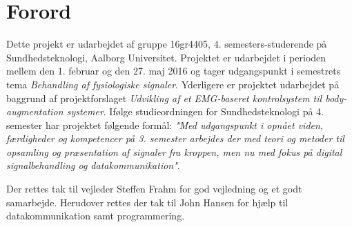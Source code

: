 \chapter*{Forord}
Dette projekt er udarbejdet af gruppe 16gr4405, 4. semesters-studerende på Sundhedsteknologi, Aalborg Universitet. Projektet er udarbejdet i perioden mellem den 1. februar og den 27. maj 2016 og tager udgangspunkt i semestrets tema \textit{Behandling af fysiologiske signaler}. Yderligere er projektet udarbejdet på baggrund af projektforslaget \textit{Udvikling af et EMG-baseret kontrolsystem til body-augmentation systemer}. Ifølge studieordningen for Sundhedsteknologi på 4. semester har projektet følgende formål: \textit{"Med udgangspunkt i opnået viden, færdigheder og kompetencer på 3. semester arbejdes der med teori og metoder til opsamling og præsentation af signaler fra kroppen, men nu med fokus på digital signalbehandling og datakommunikation"}. \citep{aalborguniversitet2014}

Der rettes tak til vejleder Steffen Frahm for god vejledning og et godt samarbejde. Herudover rettes der tak til John Hansen for hjælp til datakommunikation samt programmering. 